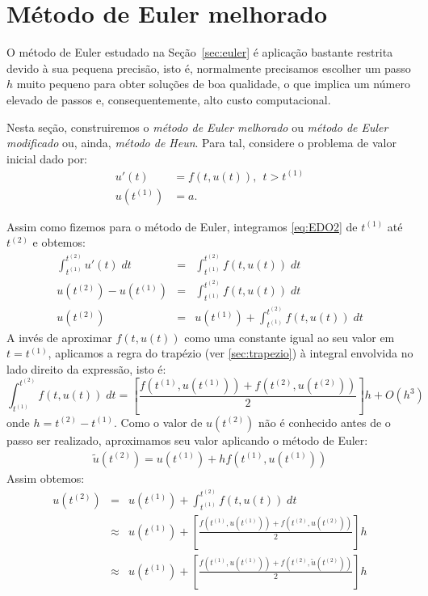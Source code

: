 \section{Método de Euler melhorado}\label{sec:sec_euler_mod}
O método de Euler estudado na Seção~\ref{sec:euler} é aplicação bastante restrita devido à sua pequena precisão, isto é, normalmente precisamos escolher um passo $h$ muito pequeno para obter soluções de boa qualidade, o que implica um número elevado de passos e, consequentemente, alto custo computacional.

Nesta seção, construiremos o \emph{método de Euler melhorado} ou \emph{método de Euler modificado} ou, ainda, \emph{método de Heun}. Para tal, considere o problema de valor inicial dado por:
\begin{equation}\label{eq:EDO2}
  \begin{split}
    u'(t)  &= f(t,u(t)),~~t>t^{(1)} \\
    u(t^{(1)}) &= a.
  \end{split}
\end{equation}

Assim como fizemos para o método de Euler, integramos \eqref{eq:EDO2} de $t^{(1)}$ até $t^{(2)}$ e obtemos:
\begin{eqnarray}
  \int_{t^{(1)}}^{t^{(2)}} u'(t) \;dt &=& \int_{t^{(1)}}^{t^{(2)}} f(t,u(t)) \; dt\\
  u(t^{(2)})-u(t^{(1)})               &=& \int_{t^{(1)}}^{t^{(2)}} f(t,u(t)) \; dt\\
  u(t^{(2)})                      &=& u(t^{(1)}) +  \int _{t^{(1)}}^{t^{(2)}} f(t,u(t)) \; dt
\end{eqnarray}
A invés de aproximar $f(t,u(t))$ como uma constante igual ao seu valor em $t=t^{(1)}$, aplicamos a regra do trapézio (ver \ref{sec:trapezio}) à integral envolvida no lado direito da expressão, isto é:
\begin{equation}\label{eq:euler_mel_eq}
\int _{t^{(1)}}^{t^{(2)}} f(t,u(t)) \; dt = \left[\frac{f\left(t^{(1)},u(t^{(1)})\right)+f\left(t^{(2)},u(t^{(2)})\right)}{2}\right]h + O(h^3)
\end{equation}
onde $h=t^{(2)}-t^{(1)}$.
Como o valor de $u(t^{(2)})$ não é conhecido antes de o passo ser realizado, aproximamos seu valor aplicando o método de Euler:
\begin{eqnarray}
\tilde{u}(t^{(2)})= u(t^{(1)})+h f\left(t^{(1)},u(t^{(1)})\right)
\end{eqnarray}
Assim obtemos:
\begin{eqnarray}
  u(t^{(2)})&=& u(t^{(1)}) +  \int _{t^{(1)}}^{t^{(2)}} f(t,u(t)) \; dt\\
  &\approx& u(t^{(1)}) +\left[\frac{f\left(t^{(1)},u(t^{(1)})\right)+f\left(t^{(2)},u(t^{(2)})\right)}{2}\right]h\\
  &\approx& u(t^{(1)}) +\left[\frac{f\left(t^{(1)},u(t^{(1)})\right)+f\left(t^{(2)},\tilde{u}(t^{(2)})\right)}{2}\right]h\\
\end{eqnarray}

